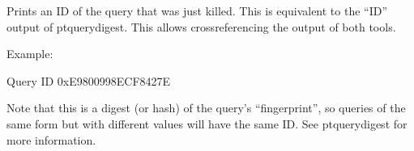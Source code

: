 \documentclass[letterpaper,10pt,english]{sphinxmanual}
\begin{document}

\begin{fulllineitems}
\label{\detokenize{mariadb-kill:cmdoption-mariadb-kill-query-id}}
\sphinxAtStartPar
Prints an ID of the query that was just killed. This is
equivalent to the “ID” output of pt\sphinxhyphen{}query\sphinxhyphen{}digest. This allows
cross\sphinxhyphen{}referencing the output of both tools.

\sphinxAtStartPar
Example:

\begin{sphinxVerbatim}[commandchars=\\\{\}]
Query ID 0xE9800998ECF8427E
\end{sphinxVerbatim}

\sphinxAtStartPar
Note that this is a digest (or hash) of the query’s “fingerprint”,
so queries of the same form but with different values will have the same ID.
See pt\sphinxhyphen{}query\sphinxhyphen{}digest for more information.

\end{fulllineitems}

\end{document}
